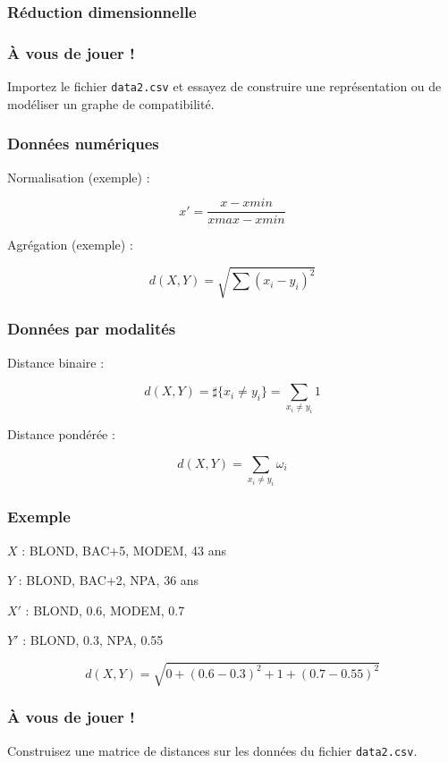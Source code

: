\documentclass[11pt]{beamer}
\newenvironment{slide}[1]{%
\begin{frame}[environment=slide]
\frametitle{#1}
}{%
\end{frame}
}
\newcommand{\Python}[1]{
	{\small	}
}
\begin{document}
\begin{slide}{Réduction dimensionnelle}
\begin{center}
\Python{acp}
\end{center}
\end{slide}


\begin{slide}{{\`A} vous de jouer !}

Importez le fichier \texttt{data2.csv} et essayez de construire une représentation ou de modéliser un graphe de compatibilité.

\end{slide}

\begin{slide}{Données numériques}

Normalisation (exemple) : 

$$x' = \frac{x-xmin}{xmax-xmin}$$

Agrégation (exemple) :

$$ d(X,Y) = \sqrt{\sum(x_i-y_i)^2} $$

\end{slide}

\begin{slide}{Données par modalités}

Distance binaire :

$$ d(X,Y) = \sharp \{ x_i \neq y_i \} = \sum_{x_i \neq y_i} 1 $$

Distance pondérée :

$$ d(X,Y) = \sum_{x_i \neq y_i} \omega_i $$

\end{slide}

\begin{slide}{Exemple}

$X$ : BLOND, BAC+5, MODEM, 43 ans

$Y$ : BLOND, BAC+2, NPA, 36 ans\\

\vspace{0.2cm}

\pause

$X'$ : BLOND, 0.6, MODEM, 0.7

$Y'$ : BLOND, 0.3, NPA, 0.55

\pause

$$d(X,Y) = \sqrt{0 + (0.6-0.3)^2 + 1 + (0.7-0.55)^2}$$

\end{slide}


\begin{slide}{{\`A} vous de jouer !}

Construisez une matrice de distances sur les données du fichier \texttt{data2.csv}.

\end{slide}
\end{document}
